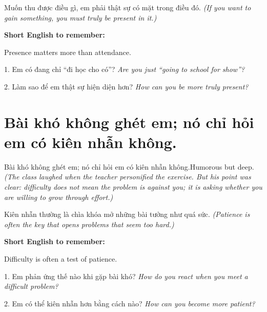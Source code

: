 \begin{baihoc}
Muốn thu được điều gì, em phải thật sự có mặt trong điều đó.
\textit{(If you want to gain something, you must truly be present in it.)}
\end{baihoc}

\begin{ghinhoanh}
\textbf{Short English to remember:}

Presence matters more than attendance.

\end{ghinhoanh}

\begin{tuhocnhanh}
1. Em có đang chỉ “đi học cho có”? \textit{Are you just “going to school for show”?}

2. Làm sao để em thật sự hiện diện hơn? \textit{How can you be more truly present?}
\end{tuhocnhanh}
\ngancach

\section{Bài khó không ghét em; nó chỉ hỏi em có kiên nhẫn không.}
\begin{truyen}{Bài khó không ghét em; nó chỉ hỏi em có kiên nhẫn không.}{Humorous but deep.}
\textit{(The class laughed when the teacher personified the exercise. But his point was clear: difficulty does not mean the problem is against you; it is asking whether you are willing to grow through effort.)}
\end{truyen}

\begin{baihoc}
Kiên nhẫn thường là chìa khóa mở những bài tưởng như quá sức.
\textit{(Patience is often the key that opens problems that seem too hard.)}
\end{baihoc}

\begin{ghinhoanh}
\textbf{Short English to remember:}

Difficulty is often a test of patience.

\end{ghinhoanh}

\begin{tuhocnhanh}
1. Em phản ứng thế nào khi gặp bài khó? \textit{How do you react when you meet a difficult problem?}

2. Em có thể kiên nhẫn hơn bằng cách nào? \textit{How can you become more patient?}
\end{tuhocnhanh}
\ngancach


